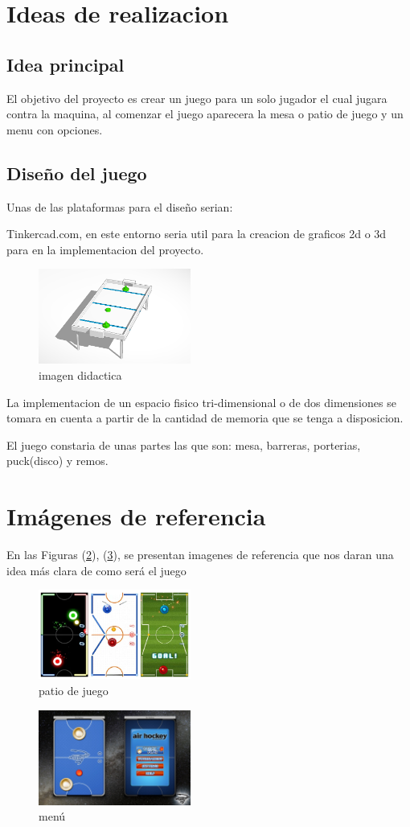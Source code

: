 \documentclass{article}
\begin{document}
\section{Ideas de realizacion}
\label{contenido}
\subsection{Idea principal}

El objetivo del proyecto es crear un juego para un solo jugador el cual jugara contra la maquina, al comenzar el juego aparecera la mesa o patio de juego y un menu con opciones.

\subsection{Diseño del juego}
Unas de las plataformas para el diseño serian: 

Tinkercad.com, en este entorno seria util para la creacion de graficos 2d o 3d para en la implementacion del proyecto.

\begin{figure}[h]
\includegraphics[width=5cm]{plantilla_latex/imagenes/tinkercad_1.png}
\centering
\caption{imagen didactica}
\label{fig:cpplogo}
\end{figure}
La implementacion de un espacio fisico tri-dimensional o de dos dimensiones se tomara en cuenta a partir de la cantidad de memoria que se tenga a disposicion.


El juego constaria de unas partes las que son: mesa, barreras, porterias, puck(disco) y remos.

\section{ Imágenes de referencia} \label{imagenes}

En las Figuras (\ref{fig:Air-Hockey}), (\ref{fig:air-menu}), se   presentan imagenes de referencia que nos daran una idea más clara de como será el juego

\label{imagenes}
\begin{figure}[h]
\includegraphics[width=5cm]{plantilla_latex/imagenes/Air-Hockey.png}
\centering
\caption{patio de juego}
\label{fig:Air-Hockey}
\end{figure}


\label{imagenes}
\begin{figure}[h]
\includegraphics[width=5cm]{plantilla_latex/imagenes/air-menu.jpg}
\centering
\caption{ menú}
\label{fig:air-menu}
\end{figure}
\end{document}
